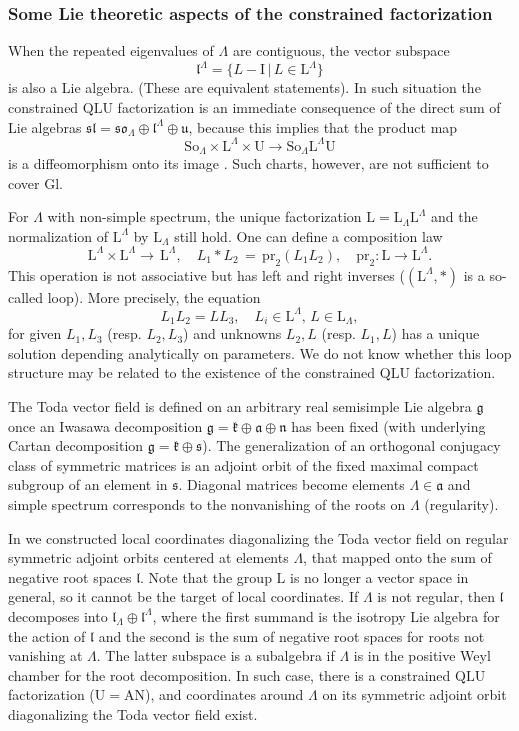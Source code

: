 \documentclass[reqno]{amsart}
\renewcommand{\gg}{\mathfrak{g}}
\newcommand{\nn}{\mathfrak{n}}
\newcommand{\kk}{\mathfrak{k}}
\renewcommand{\ll}{\mathfrak{l}}
\renewcommand{\aa}{\mathfrak{a}}
\newcommand{\uu}{\mathfrak{u}}
\renewcommand{\ss}{\mathfrak{s}}
\renewcommand{\sl}{\mathfrak{sl}}
\newcommand{\so}{\mathfrak{so}}
\newcommand{\pr}{\mathrm{pr}}
\newcommand{\Gl}{\mathrm{Gl}}
\newcommand{\So}{\mathrm{So}}
\renewcommand{\L}{\mathrm{L}}
\newcommand{\U}{\mathrm{U}}
\theoremstyle{definition} %
\begin{document}
\subsubsection{Some Lie theoretic aspects of the constrained factorization}\label{ssec:Lie-theory}
When the repeated eigenvalues of $\Lambda$ are contiguous, the vector subspace  \[\ll^\Lambda=\{L-\mathrm{I}\,|\,L\in \L^\Lambda\}\] is also a Lie algebra. (These are equivalent statements). In such situation the constrained $\mathrm{Q}\L\U$ factorization is an immediate consequence of the direct sum of Lie algebras
$\sl=\so_\Lambda\oplus \ll^\Lambda\oplus \uu$,
because this implies that the product map
\[\So_\Lambda\times \L^\Lambda\times \U\longrightarrow\So_\Lambda \L^\Lambda\U\]
is a diffeomorphism onto its image \cite[Lemma 6.44]{Kn}. Such charts, however, are not sufficient to cover $\Gl$.

For $\Lambda$ with non-simple spectrum, the unique factorization $\L=\L_\Lambda\L^\Lambda$  and the normalization of $\L^\Lambda$ by $\L_\Lambda$ still hold. One can define a composition law
\[\L^\Lambda\times \L^\Lambda\longrightarrow \, \L^\Lambda,\quad L_1\ast L_2\, = \, \mathrm{pr}_2(L_1L_2),\quad \pr_2:\L\longrightarrow\L^\Lambda.\]
This operation is not associative but has left and right inverses ($(\L^\Lambda,*)$ is a so-called loop). More precisely, the equation
\[L_1L_2=LL_3, \quad L_i\in \L^\Lambda,\,L\in \L_\Lambda,\]
for given $L_1,L_3$ (resp. $L_2,L_3$) and unknowns $L_2,L$ (resp. $L_1,L$) has a unique solution depending analytically on parameters. We do not know whether this loop structure may be related to  the existence of the constrained $\mathrm{Q}\L\U$ factorization.

The Toda vector field is defined on an arbitrary real semisimple Lie algebra $\gg$ once an Iwasawa decomposition $\gg=\kk\oplus\aa\oplus \nn$ has been fixed (with underlying Cartan decomposition $\gg=\kk\oplus \ss$). The generalization of an orthogonal conjugacy class of symmetric matrices is an adjoint orbit of the fixed maximal compact subgroup of an element in $\ss$. Diagonal matrices become elements $\Lambda\in \aa$
and simple spectrum corresponds to the nonvanishing of the roots on $\Lambda$ (regularity).

In \cite{MT}
we constructed local coordinates diagonalizing the Toda vector field on regular symmetric adjoint orbits centered at elements $\Lambda$, that mapped onto  the sum of negative root spaces $\ll$. Note that the group $\L$ is no longer a vector space in general, so it cannot be the target of local coordinates. If $\Lambda$ is not regular, then $\ll$ decomposes into $\ll_\Lambda\oplus \ll^\Lambda$, where the first summand is the isotropy Lie algebra for the action of $\ll$ and the second is the sum of negative root spaces for roots not vanishing at $\Lambda$. The latter subspace is a subalgebra if  $\Lambda$ is in the positive Weyl chamber for the root decomposition. In such case, there is a constrained $\mathrm{Q}\L\U$ factorization  ($\U=\mathrm{A}\mathrm{N}$), and coordinates around $\Lambda$ on its symmetric adjoint orbit diagonalizing the Toda vector field exist.
\end{document}
